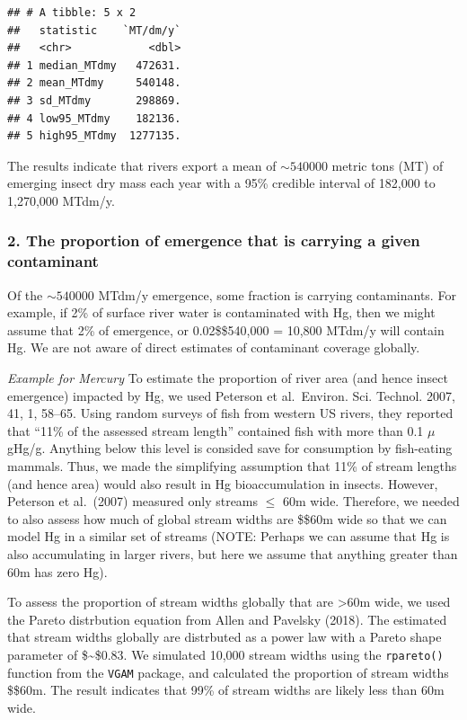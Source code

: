 \documentclass[
]{article}
\begin{document}
\begin{verbatim}
## # A tibble: 5 x 2
##   statistic    `MT/dm/y`
##   <chr>            <dbl>
## 1 median_MTdmy   472631.
## 2 mean_MTdmy     540148.
## 3 sd_MTdmy       298869.
## 4 low95_MTdmy    182136.
## 5 high95_MTdmy  1277135.
\end{verbatim}

The results indicate that rivers export a mean of \(\sim 540000\) metric
tons (MT) of emerging insect dry mass each year with a 95\% credible
interval of 182,000 to 1,270,000 MTdm/y.

\hypertarget{the-proportion-of-emergence-that-is-carrying-a-given-contaminant}{%
\subsubsection{2. The proportion of emergence that is carrying a given
contaminant}\label{the-proportion-of-emergence-that-is-carrying-a-given-contaminant}}

Of the \(\sim 540000\) MTdm/y emergence, some fraction is carrying
contaminants. For example, if 2\% of surface river water is contaminated
with Hg, then we might assume that 2\% of emergence, or
0.02\$\times\$540,000 = 10,800 MTdm/y will contain Hg. We are not aware
of direct estimates of contaminant coverage globally.

\emph{Example for Mercury} To estimate the proportion of river area (and
hence insect emergence) impacted by Hg, we used Peterson et al.~Environ.
Sci. Technol. 2007, 41, 1, 58--65. Using random surveys of fish from
western US rivers, they reported that ``11\% of the assessed stream
length'' contained fish with more than 0.1 \(\mu\)gHg/g. Anything below
this level is consided save for consumption by fish-eating mammals.
Thus, we made the simplifying assumption that 11\% of stream lengths
(and hence area) would also result in Hg bioaccumulation in insects.
However, Peterson et al.~(2007) measured only streams \(\leq\) 60m wide.
Therefore, we needed to also assess how much of global stream widths are
\$\leq\$60m wide so that we can model Hg in a similar set of streams
(NOTE: Perhaps we can assume that Hg is also accumulating in larger
rivers, but here we assume that anything greater than 60m has zero Hg).

To assess the proportion of stream widths globally that are
\textgreater60m wide, we used the Pareto distrbution equation from Allen
and Pavelsky (2018). The estimated that stream widths globally are
distrbuted as a power law with a Pareto shape parameter of \$\sim\$0.83.
We simulated 10,000 stream widths using the \texttt{rpareto()} function
from the \texttt{VGAM} package, and calculated the proportion of stream
widths \$\leq\$60m. The result indicates that 99\% of stream widths are
likely less than 60m wide.
\end{document}
